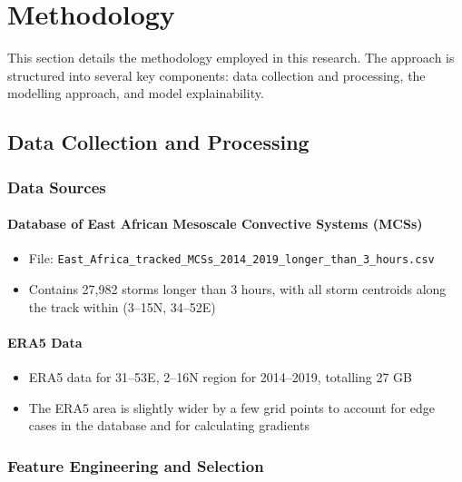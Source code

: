 \chapter{Methodology}
\label{ch:method}

This section details the methodology employed in this research. The approach is structured into several key components: data collection and processing, the modelling approach, and model explainability.

\section{Data Collection and Processing}

\subsection{Data Sources}

\subsubsection{Database of East African Mesoscale Convective Systems (MCSs)}

\begin{itemize}
    \item File: \texttt{East\_Africa\_tracked\_MCSs\_2014\_2019\_longer\_than\_3\_hours.csv}
    \item Contains 27,982 storms longer than 3 hours, with all storm centroids along the track within (3--15N, 34--52E)
\end{itemize}

\subsubsection{ERA5 Data}

\begin{itemize}
    \item ERA5 data for 31--53E, 2--16N region for 2014--2019, totalling 27 GB
    \item The ERA5 area is slightly wider by a few grid points to account for edge cases in the database and for calculating gradients
\end{itemize}


\subsection{Feature Engineering and Selection}

